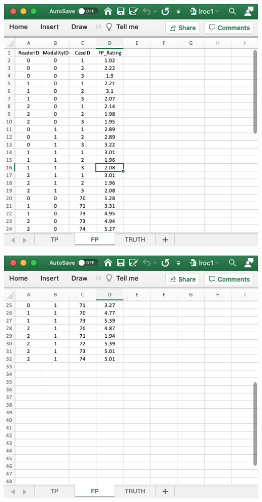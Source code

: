 \documentclass[
]{book}
\begin{document}
\includegraphics[width=1\textwidth,height=\textheight]{images/quick-start/lroc1FP1.png}

\includegraphics[width=1\textwidth,height=\textheight]{images/quick-start/lroc1FP2.png}
\end{document}
